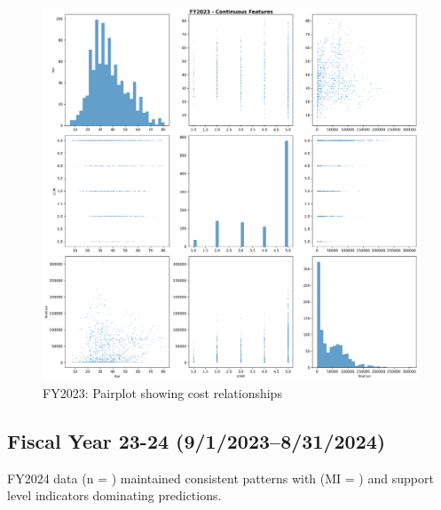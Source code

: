 \newpage

\vspace*{\fill}
\begin{figure}[htbp]
\centering
\includegraphics[width=\textwidth]{fy2023_pairplot_top_features.png}
\caption{FY2023: Pairplot showing cost relationships}
\end{figure}
\vspace*{\fill}

\newpage

\subsection{Fiscal Year 23-24  (9/1/2023--8/31/2024)}

FY2024 data (n = \FSRecordsFinalFYTwoThousandTwentyFour) maintained consistent patterns with \FSTopFeatureFYTwoThousandTwentyFour{} (MI = \FSTopMIFYTwoThousandTwentyFour) and support level indicators dominating predictions.

